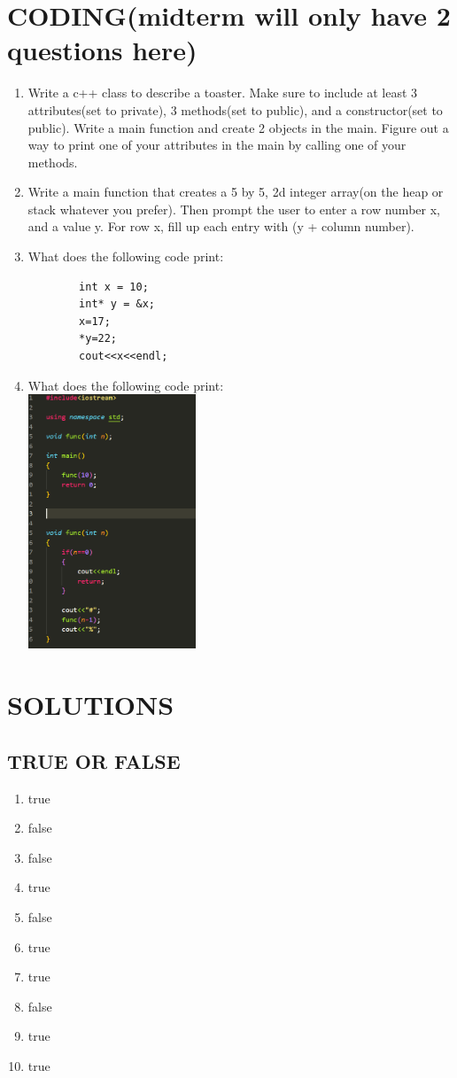 \documentclass[a4paper]{article}
\begin{document}
\section{CODING(midterm will only have 2 questions here)}
\begin{enumerate}
    \item Write a c++ class to describe a toaster. Make sure to include at least
          3 attributes(set to private), 3 methods(set to public), and a 
          constructor(set to public). Write a main function and create 2 objects in the main. Figure out a way to print one 
          of your attributes in the main by calling one of your methods.
    \item Write a main function that creates a 5 by 5, 2d integer array(on the heap or 
          stack whatever you prefer). Then prompt the user to enter a row number x, and a value y. 
          For row x, fill up each entry with (y + column number).
    \item What does the following code print:
    \begin{verbatim}
        int x = 10;
        int* y = &x;
        x=17;
        *y=22;
        cout<<x<<endl;
    \end{verbatim}
    \item What does the following code print:\\
    \includegraphics[width=5cm]{question2.png}
    
\end{enumerate} 
\newpage

\section{SOLUTIONS}
\subsection{TRUE OR FALSE}
\begin{enumerate}
    \item true
    \item false
    \item false
    \item true
    \item false
    \item true
    \item true
    \item false
    \item true
    \item true
\end{enumerate}
\end{document}
